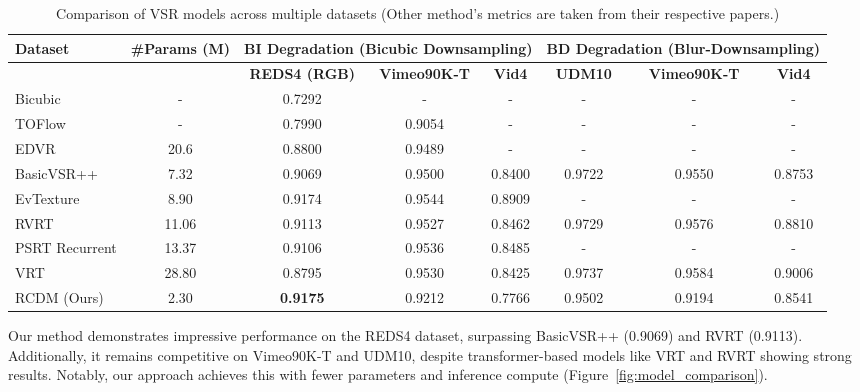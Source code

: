 \documentclass[11pt]{article}
\begin{document}
\begin{table*}[h]
\caption{Comparison of VSR models across multiple datasets (Other method's metrics are taken from their respective papers.)}
\centering
 \begin{adjustbox}{width=0.95\textwidth}
\begin{tabular}{l|c|c|c|c|c|c|c}
\hline
\textbf{Dataset} & \textbf{\#Params (M)} & \multicolumn{3}{c|}{\textbf{BI Degradation (Bicubic Downsampling)}} & \multicolumn{3}{c}{\textbf{BD Degradation (Blur-Downsampling)}} \\
\hline
 &  & \textbf{REDS4 (RGB)} & \textbf{Vimeo90K-T} & \textbf{Vid4} & \textbf{UDM10} & \textbf{Vimeo90K-T} & \textbf{Vid4} \\
\hline

Bicubic & - & 0.7292 & - & - & - & - & - \\
TOFlow \cite{xue2019tof} & - & 0.7990 & 0.9054 & - & - & - & - \\
EDVR \cite{wang2019edvr} & 20.6 & 0.8800 & 0.9489 & - & - & - & - \\

BasicVSR++ \cite{chan2022basicvsrpp} & 7.32 & 0.9069 & 0.9500 & 0.8400 & 0.9722 & 0.9550 & 0.8753 \\
EvTexture\cite{evtexture2023} & 8.90 & 0.9174 & 0.9544 & 0.8909 & - & - & - \\
RVRT \cite{liang2022rvrt} & 11.06 & 0.9113 & 0.9527 & 0.8462 & 0.9729 & 0.9576 & 0.8810 \\
PSRT Recurrent\cite{psrt2023} & 13.37 & 0.9106 & 0.9536 & 0.8485 & - & - & - \\
VRT \cite{liang2022vrt} & 28.80 & 0.8795 & 0.9530 & 0.8425 & 0.9737 & 0.9584 & 0.9006 \\
\hline
RCDM (Ours) & 2.30 & \textbf{0.9175} & 0.9212 & 0.7766 & 0.9502 & 0.9194 & 0.8541 \\

\hline
\end{tabular}
\end{adjustbox}


\label{tab:vsr_comparison}
\end{table*}

Our method demonstrates impressive performance on the REDS4 dataset, surpassing BasicVSR++ (0.9069) and RVRT (0.9113). Additionally, it remains competitive on Vimeo90K-T and UDM10, despite transformer-based models like VRT and RVRT showing strong results. Notably, our approach achieves this with fewer parameters and inference compute (Figure~\ref{fig:model_comparison}).
\end{document}
